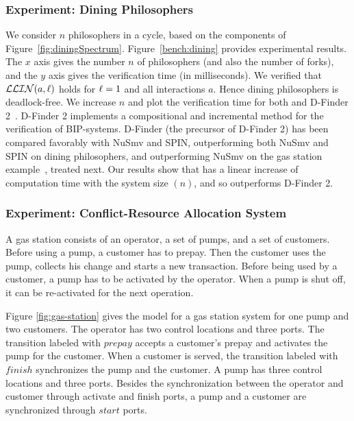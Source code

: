 \subsubsection{Experiment: Dining Philosophers} 
We consider $n$ philosophers in a cycle, based on the components of Figure~\ref{fig:diningSpectrum}.
Figure~\ref{bench:dining} provides experimental results.
The $x$ axis gives the number $n$ of philosophers (and also the number of forks), 
and the $y$ axis gives the verification time (in
milliseconds).  We verified that $\mathcal{LLIN}(a, \ell)$ holds for
$\ell = 1$ and all interactions $a$. Hence dining philosophers is deadlock-free.
%
We increase $n$ and plot the verification
time for both \ldfctool and D-Finder 2~\cite{DFinder2}.
D-Finder 2 implements a compositional and incremental method for the
verification of BIP-systems. D-Finder
(the precursor of D-Finder 2) has been compared favorably with NuSmv and
SPIN, outperforming both  NuSmv and SPIN on
dining philosophers, and outperforming NuSmv on the gas station
example~\cite{bensalem2010compositional}, treated next.
%
Our results show that \ldfctool has a linear increase of computation time with the system size
$(n)$, and so outperforms D-Finder 2.


\subsubsection{Experiment: Conflict-Resource Allocation System}
A gas station \cite{gasstation} consists of an operator, %
a set of pumps, and a set of customers. 
Before using a pump, a customer has to prepay. Then the customer uses the
pump, collects his change and %
starts a new transaction.
%
Before being used by a customer, a pump has to be activated by the
operator.  When a pump is shut off, it can be re-activated for the
next operation.  


Figure \ref{fig:gas-station} gives the model for a
gas station system for one pump and two customers.  The operator has
two control locations and three ports. The transition labeled with
$\mathit{prepay}$ accepts a customer's prepay and activates the pump for the
customer. When a customer is served, the transition labeled with
$\mathit{finish}$ synchronizes the pump and the customer.  A pump has three
control locations and three ports. Besides the synchronization between
the operator and customer through activate and finish ports, a pump
and a customer are synchronized through $\mathit{start}$ ports.

